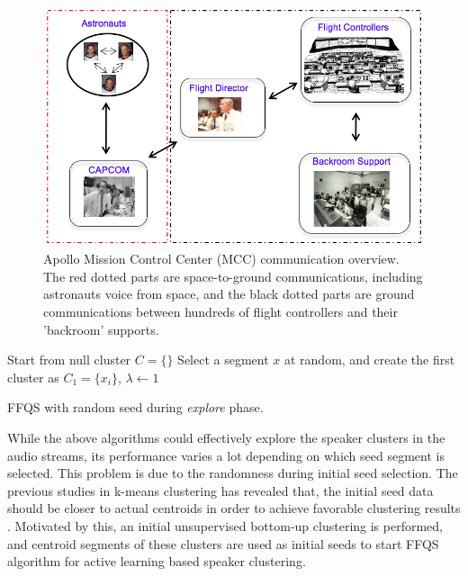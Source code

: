\documentclass[journal,10pt]{IEEEtran}
\begin{document}
\begin{figure}[t]
\centering
	\includegraphics[width=0.75\linewidth]{figs/comm5}
	\caption{Apollo Mission Control Center (MCC) communication overview. The red dotted parts are space-to-ground communications, including astronauts voice from space, and the black dotted parts are ground communications between hundreds of flight controllers and their 'backroom' supports. }
	\label{fig:comm}
\end{figure} 
\begin{algorithm}
	Start from null cluster $C= \{\}$\;
	Select a segment $x$ at random, and create the first cluster as $C_1 = \{x_i\}$, $\lambda \leftarrow 1$\; 
	\caption{FFQS with random seed during \textit{explore} phase.}
	\label{a1}
\end{algorithm}
 
While the above algorithms could effectively explore the speaker clusters in the audio streams, its performance varies a lot depending on which seed segment is selected. This problem is due to the randomness during initial seed selection. The previous studies in k-means clustering has revealed that, the initial seed data should be closer to actual centroids in order to achieve favorable clustering results \cite{khan2004cluster}. Motivated by this, an initial unsupervised bottom-up clustering is performed, and centroid segments of these clusters are used as initial seeds to start FFQS algorithm for active learning based speaker clustering.
\end{document}

